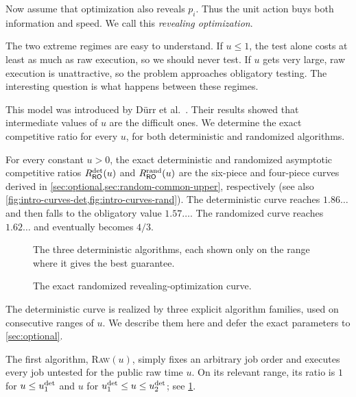 Now assume that optimization also reveals $p_i$.  Thus the unit action buys
both information and speed.  We call this \emph{revealing optimization}.

The two extreme regimes are easy to understand.  If $u\leq1$, the test alone
costs at least as much as raw execution, so we should never test.  If $u$
gets very large, raw execution is unattractive, so the problem approaches
obligatory testing.  The interesting question is what happens between these
regimes.

This model was introduced by D{\"u}rr et
al.~\cite{DurrErlebachMegowMeissner2020}.  Their results showed that
intermediate values of $u$ are the difficult ones.  We determine the exact
competitive ratio for every $u$, for both deterministic and randomized
algorithms.


\begin{theorem}
\label{thm:intro-common-upper-curves}
For every constant $u>0$, the exact deterministic and randomized asymptotic
competitive ratios $R_{\mathsf{RO}}^{\mathrm{det}}(u)$ and $R_{\mathsf{RO}}^{\mathrm{rand}}(u)$ are the six-piece and
four-piece curves derived in
\cref{sec:optional,sec:random-common-upper}, respectively (see also
\cref{fig:intro-curves-det,fig:intro-curves-rand}).
The deterministic curve reaches
$1.86\ldots$ and then falls to the obligatory value
$1.57\ldots$.  The randomized curve reaches $1.62\ldots$ and
eventually becomes $4/3$.
\end{theorem}

\begin{figure}[H]
\centering

\caption{The three deterministic algorithms, each shown only on the range
where it gives the best guarantee.}
\label{fig:intro-curves-det}
\end{figure}

\begin{figure}[H]
\centering

\caption{The exact randomized revealing-optimization curve.}
\label{fig:intro-curves-rand}
\end{figure}

The deterministic curve is realized by three explicit algorithm families,
used on consecutive ranges of $u$.  We describe them here and defer the exact
parameters to \cref{sec:optional}.

The first algorithm, \textsc{Raw}$(u)$, simply fixes an arbitrary job order
and executes every job untested for the public raw time $u$.  On its relevant
range, its ratio is $1$ for $u\le u_{1}^{\mathrm{det}}$ and $u$ for
$u_{1}^{\mathrm{det}}\le u\le u_{2}^{\mathrm{det}}$; see \cref{fig:intro-curves-det}.

